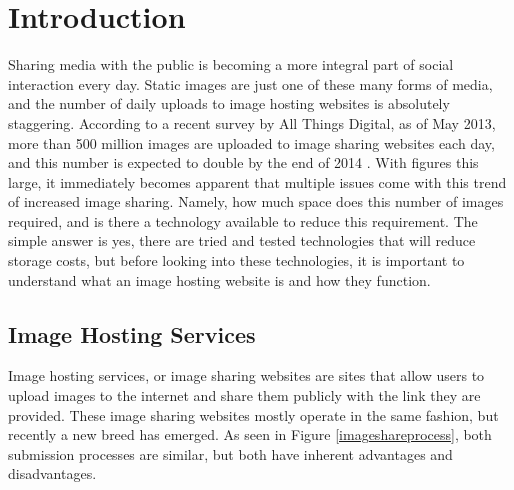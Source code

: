 %
%

\chapter{Introduction}\label{ch:intro} %


Sharing media with the public is becoming a more integral part of social interaction every day. Static images are just one of these many forms of media, and the number of daily uploads to image hosting websites is absolutely staggering. According to a recent survey by All Things Digital, as of May 2013, more than 500 million images are uploaded to image sharing websites each day, and this number is expected to double by the end of 2014 \cite{meek:500}. With figures this large, it immediately becomes apparent that multiple issues come with this trend of increased image sharing. Namely, how much space does this number of images required, and is there a technology available to reduce this requirement. The simple answer is yes, there are tried and tested technologies that will reduce storage costs, but before looking into these technologies, it is important to understand what an image hosting website is and how they function.

\section{Image Hosting Services} \label{sec:imagehostingservices}
Image hosting services, or image sharing websites are sites that allow users to upload images to the internet and share them publicly with the link they are provided. These image sharing websites mostly operate in the same fashion, but recently a new breed has emerged. As seen in Figure \ref{imageshareprocess}, both submission processes are similar, but both have inherent advantages and disadvantages.

